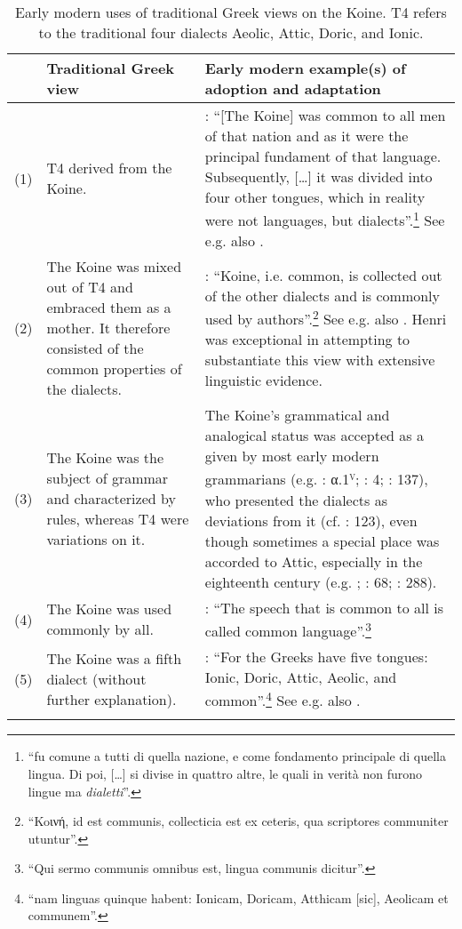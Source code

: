 {\begin{sidewaystable}\footnotesize
\caption{Early modern uses of traditional Greek views on the Koine. T4 refers to the traditional four dialects Aeolic, Attic, Doric, and Ionic.\label{tab:2.2}}
\begin{tabularx}{\textwidth}{l@{ }QQ}
\lsptoprule 
 & {Traditional Greek view} & Early modern example(s) of adoption and adaptation\\\midrule
 (1) & T4 derived from the Koine. & \citet[335]{Borghini1971}: “[The Koine] was common to all men of that nation and as it were the principal fundament of that language. Subsequently, […] it was divided into four other tongues, which in reality were not languages, but dialects”.\footnote{“fu comune a tutti di quella nazione, e come fondamento principale di quella lingua. Di poi, […] si divise in quattro altre, le quali in verità non furono lingue ma \textit{dialetti}”.} See e.g. also \citet[209]{Vergara1537}.\\
 (2) & The Koine was mixed out of T4 and embraced them as a mother. It therefore consisted of the common properties of the dialects. & \citet[52]{Oecolampadius1518}: “Koine, i.e. common, is collected out of the other dialects and is commonly used by authors”.\footnote{“Koινή, id est communis, collecticia est ex ceteris, qua scriptores communiter utuntur”.} See e.g. also \citet[10\textsc{\textsuperscript{r}}\textsc{–10}\textsc{\textsuperscript{v}}]{Girard1541}. Henri \citet[28--34]{Estienne1581} was exceptional in attempting to substantiate this view with extensive linguistic evidence.\\
 (3) & The Koine was the subject of grammar and characterized by rules, whereas T4 were variations on it. & The Koine’s grammatical and analogical status was accepted as a given by most early modern grammarians (e.g. \citealt{Gaza1495}: α.1\textsc{\textsuperscript{v}}; \citealt{Schmidt1604}: 4; \citealt{Walch1772}: 137), who presented the dialects as deviations from it (cf. \citealt{Ciccolella2008}: 123), even though sometimes a special place was accorded to Attic, especially in the eighteenth century (e.g. \citealt{Luscinius1517}; \citealt{Hemsterhuis1721}: 68; \citealt{Jehne1782}: 288).\\
 (4) & The Koine was used commonly by all. & \citet[a.i\textsc{\textsuperscript{v}}]{Melanchthon1518}: “The speech that is common to all is called common language”.\footnote{“Qui sermo communis omnibus est, lingua communis dicitur”.}\\
 (5) & The Koine was a fifth dialect (without further explanation). & \citet[138\textsc{\textsuperscript{v}}]{Beroaldo1493}: “For the Greeks have five tongues: Ionic, Doric, Attic, Aeolic, and common”.\footnote{“nam linguas quinque habent: Ionicam, Doricam, Atthicam [sic], Aeolicam et communem”.} See e.g. also \citet[85\textsc{\textsuperscript{r}}]{Perotti1489}.\\
\lspbottomrule
\end{tabularx}
\end{sidewaystable}

}
